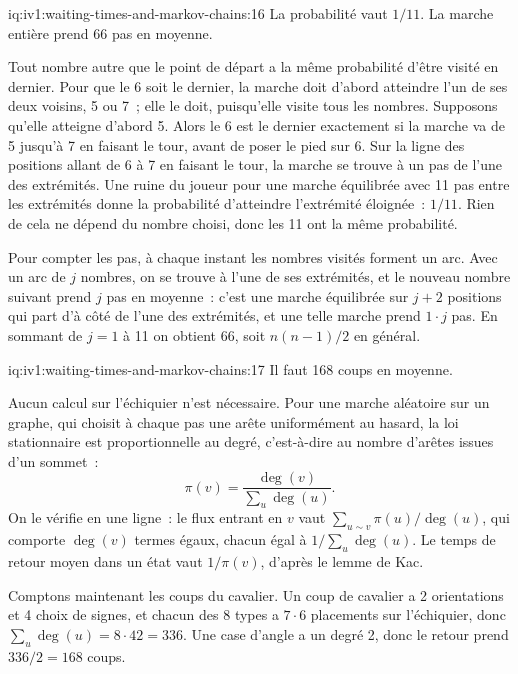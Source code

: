 \begin{solution}{iq:iv1:waiting-times-and-markov-chains:16}
La probabilité vaut $1/11$. La marche entière prend $66$ pas en moyenne.

Tout nombre autre que le point de départ a la même probabilité d'être visité en dernier. Pour que le 6 soit le dernier, la marche doit d'abord atteindre l'un de ses deux voisins, 5 ou 7~; elle le doit, puisqu'elle visite tous les nombres. Supposons qu'elle atteigne d'abord 5. Alors le 6 est le dernier exactement si la marche va de 5 jusqu'à 7 en faisant le tour, avant de poser le pied sur 6. Sur la ligne des positions allant de 6 à 7 en faisant le tour, la marche se trouve à un pas de l'une des extrémités. Une ruine du joueur pour une marche équilibrée avec 11 pas entre les extrémités donne la probabilité d'atteindre l'extrémité éloignée~: $1/11$. Rien de cela ne dépend du nombre choisi, donc les 11 ont la même probabilité.

Pour compter les pas, à chaque instant les nombres visités forment un arc. Avec un arc de $j$ nombres, on se trouve à l'une de ses extrémités, et le nouveau nombre suivant prend $j$ pas en moyenne~: c'est une marche équilibrée sur $j + 2$ positions qui part d'à côté de l'une des extrémités, et une telle marche prend $1 \cdot j$ pas. En sommant de $j = 1$ à 11 on obtient $66$, soit $n(n-1)/2$ en général.

\end{solution}

\begin{solution}{iq:iv1:waiting-times-and-markov-chains:17}
Il faut 168 coups en moyenne.

Aucun calcul sur l'échiquier n'est nécessaire. Pour une marche aléatoire sur un graphe, qui choisit à chaque pas une arête uniformément au hasard, la loi stationnaire est proportionnelle au degré, c'est-à-dire au nombre d'arêtes issues d'un sommet~:
\[
\pi(v) = \frac{\deg(v)}{\sum_u \deg(u)}.
\]
On le vérifie en une ligne~: le flux entrant en $v$ vaut $\sum_{u \sim v} \pi(u)/\deg(u)$, qui comporte $\deg(v)$ termes égaux, chacun égal à $1/\sum_u \deg(u)$. Le temps de retour moyen dans un état vaut $1/\pi(v)$, d'après le lemme de Kac.

Comptons maintenant les coups du cavalier. Un coup de cavalier a 2 orientations et 4 choix de signes, et chacun des 8 types a $7 \cdot 6$ placements sur l'échiquier, donc $\sum_u \deg(u) = 8 \cdot 42 = 336$. Une case d'angle a un degré 2, donc le retour prend $336/2 = 168$ coups.

\end{solution}

